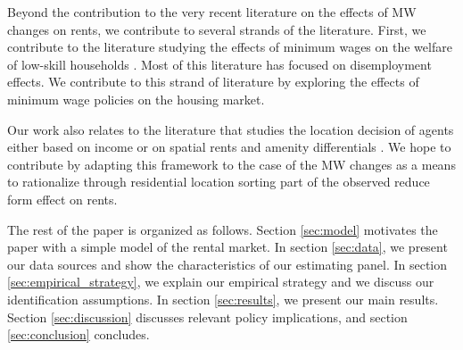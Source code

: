 


Beyond the contribution to the very recent literature on the effects of MW changes on rents, 
we contribute to several strands of the literature. First, we contribute to the literature 
studying the effects of minimum wages on the welfare of low-skill households \parencite[][among 
others]{DinardoEtAl1995, Lee1999, CardKrueger2000, Neumark2006, AutorEtAl2016, CegnizEtAl2019}. 
Most of this literature has focused on disemployment effects. We contribute to this strand of 
literature by exploring the effects of minimum wage policies on the housing market.

Our work also relates to the literature that studies the location decision of agents either 
based on income \parencite{Roback1982, Kennan2011, DesmetRossihansberg2013, PerezPerez2018, 
Monras2019} or on spatial rents and amenity differentials \parencite{Diamond2016, 
AlmagroDominguez2019, Couture2019}. We hope to contribute by adapting this framework to the 
case of the MW changes as a means to rationalize through residential location sorting part of 
the observed reduce form effect on rents.

The rest of the paper is organized as follows. Section \ref{sec:model} motivates the paper
with a simple model of the rental market. In section \ref{sec:data}, we present our data 
sources and show the characteristics of our estimating panel. In section 
\ref{sec:empirical_strategy}, we explain our empirical strategy and we discuss our 
identification assumptions. In section \ref{sec:results}, we present our main results. Section 
\ref{sec:discussion} discusses relevant policy implications, and 
section \ref{sec:conclusion} concludes.
